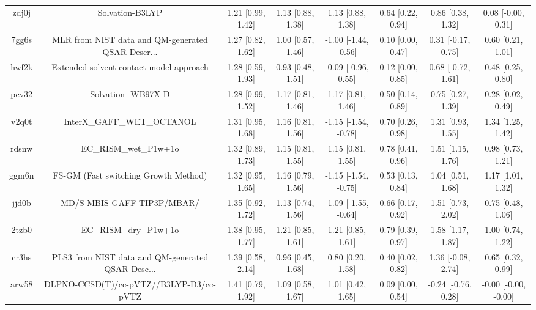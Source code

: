 \documentclass{article}
\begin{document}
\begin{center}
\begin{longtable}{|cccccccc|}
 zdj0j &                                    Solvation-B3LYP &  1.21 [0.99, 1.42] &  1.13 [0.88, 1.38] &     1.13 [0.88, 1.38] &  0.64 [0.22, 0.94] &    0.86 [0.38, 1.32] &    0.08 [-0.00, 0.31] \\
 7gg6s &  MLR from NIST data and QM-generated QSAR Descr... &  1.27 [0.82, 1.62] &  1.00 [0.57, 1.46] &  -1.00 [-1.44, -0.56] &  0.10 [0.00, 0.47] &   0.31 [-0.17, 0.75] &     0.60 [0.21, 1.01] \\
 hwf2k &            Extended solvent-contact model approach &  1.28 [0.59, 1.93] &  0.93 [0.48, 1.51] &   -0.09 [-0.96, 0.55] &  0.12 [0.00, 0.85] &   0.68 [-0.72, 1.61] &     0.48 [0.25, 0.80] \\
 pcv32 &                                 Solvation- WB97X-D &  1.28 [0.99, 1.52] &  1.17 [0.81, 1.46] &     1.17 [0.81, 1.46] &  0.50 [0.14, 0.89] &    0.75 [0.27, 1.39] &     0.28 [0.02, 0.49] \\
 v2q0t &                         InterX\_GAFF\_WET\_OCTANOL &  1.31 [0.95, 1.68] &  1.16 [0.81, 1.56] &  -1.15 [-1.54, -0.78] &  0.70 [0.26, 0.98] &    1.31 [0.93, 1.55] &     1.34 [1.25, 1.42] \\
 rdsnw &                              EC\_RISM\_wet\_P1w+1o &  1.32 [0.89, 1.73] &  1.15 [0.81, 1.55] &     1.15 [0.81, 1.55] &  0.78 [0.41, 0.96] &    1.51 [1.15, 1.76] &     0.98 [0.73, 1.21] \\
 ggm6n &               FS-GM (Fast switching Growth Method) &  1.32 [0.95, 1.65] &  1.16 [0.79, 1.56] &  -1.15 [-1.54, -0.75] &  0.53 [0.13, 0.84] &    1.04 [0.51, 1.68] &     1.17 [1.01, 1.32] \\
 jjd0b &                         MD/S-MBIS-GAFF-TIP3P/MBAR/ &  1.35 [0.92, 1.72] &  1.13 [0.74, 1.56] &  -1.09 [-1.55, -0.64] &  0.66 [0.17, 0.92] &    1.51 [0.73, 2.02] &     0.75 [0.48, 1.06] \\
 2tzb0 &                              EC\_RISM\_dry\_P1w+1o &  1.38 [0.95, 1.77] &  1.21 [0.85, 1.61] &     1.21 [0.85, 1.61] &  0.79 [0.39, 0.97] &    1.58 [1.17, 1.87] &     1.00 [0.74, 1.22] \\
 cr3hs &  PLS3 from NIST data and QM-generated QSAR Desc... &  1.39 [0.58, 2.14] &  0.96 [0.45, 1.68] &     0.80 [0.20, 1.58] &  0.40 [0.02, 0.82] &   1.36 [-0.08, 2.74] &     0.65 [0.32, 0.99] \\
 arw58 &            DLPNO-CCSD(T)/cc-pVTZ//B3LYP-D3/cc-pVTZ &  1.41 [0.79, 1.92] &  1.09 [0.58, 1.67] &     1.01 [0.42, 1.65] &  0.09 [0.00, 0.54] &  -0.24 [-0.76, 0.28] &  -0.00 [-0.00, -0.00] \\

\end{longtable}
\end{center}
\end{document}
